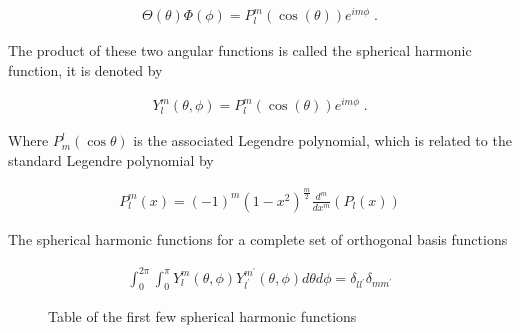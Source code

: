         \begin{align}
            \Theta (\theta) \Phi(\phi) = P^m_l(\cos(\theta)) e^{im\phi}\;.
        \end{align}

        \noindent The product of these two angular functions is called the spherical harmonic function, it is denoted by 

        \begin{align}
            Y^m_l (\theta, \phi) = P^m_l(\cos(\theta)) e^{im\phi}\;.
        \end{align}

        \noindent Where $P^l_m(\cos \theta)$ is the associated Legendre polynomial, which is related to the standard Legendre polynomial by 

        \begin{align}
            P^m_l(x) = (-1)^m (1-x^2)^{\frac{m}{2}} \frac{d^m}{dx^m} \left(P_l(x) \right)
        \end{align}

        The spherical harmonic functions for a complete set of orthogonal basis functions 

        \begin{align}
            \int_0^{2\pi} \int_0^\pi Y^m_l(\theta, \phi) Y^{m^\prime}_{l^\prime}(\theta, \phi) d\theta d\phi = \delta_{ll^\prime}\delta_{mm^\prime}
        \end{align}

        \begin{figure}[h]
            \centering 
            \caption{Table of the first few spherical harmonic functions}
            \label{tab:spherical_harmonic}
        \end{figure}

